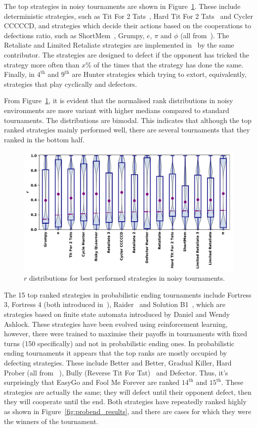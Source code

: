 \documentclass{article}
\begin{document}
The top strategies in noisy tournaments are shown in Figure~\ref{fig:noisy_results}. These include deterministic strategies, such
as Tit For 2 Tats~\cite{Axelrod1980b}, Hard Tit For 2 Tats~\cite{Stewart2012}
and Cycler CCCCCD, and strategies which decide their actions based on the
cooperations to defections ratio, such as ShortMem~\cite{Carvalho2013}, Grumpy,
$e$, $\pi$ and $\phi$ (all from~\cite{axelrodproject}). The Retaliate and
Limited Retaliate strategies are implemented in~\cite{axelrodproject} by the
same contributor. The strategies are designed to defect if the opponent has
tricked the strategy more often than \(x\%\) of the times that the strategy has
done the same. Finally, in $4^{\text{th}}$ and $9^{\text{th}}$ are Hunter
strategies which trying to extort, equivalently, strategies that play cyclically
and defectors.

From Figure~\ref{fig:noisy_results}, it is evident that the normalised rank
distributions in noisy environments are more variant with higher medians
compared to standard tournaments. The distributions are bimodal.
This indicates that although the top ranked strategies mainly performed
well, there are several tournaments that they ranked in the bottom half.

\begin{figure}[!htbp]
    \centering
    \includegraphics[width=.55\textwidth]{../images/performance_noise.pdf}
    \caption{\(r\) distributions for best performed strategies in noisy tournaments.}
    \label{fig:noisy_results}
\end{figure}

The 15 top ranked strategies in probabilistic ending tournaments include
Fortress 3, Fortress 4 (both introduced in~\cite{Ashlock2006}),
Raider~\cite{Ashlock2014} and Solution B1~\cite{Ashlock2014}, which are
strategies based on finite state automata introduced by Daniel and Wendy
Ashlock. These strategies have been evolved using reinforcement learning, however,
there were trained to maximise their payoffs in tournaments with fixed turns
(150 specifically) and not in probabilistic ending ones. In probabilistic ending
tournaments it appears that the top ranks are mostly occupied by defecting
strategies. These include Better and Better, Gradual Killer, Hard Prober (all
from ~\cite{prison}), Bully (Reverse Tit For Tat)~\cite{Nachbar1992} and
Defector. Thus, it's surprisingly that EasyGo and Fool Me Forever are ranked
$14^{\text{th}}$ and $15^{\text{th}}$. These strategies are actually the same;
they will defect until their opponent defect, then they will cooperate until the
end. Both strategies have repeatedly ranked highly as shown in
Figure~\ref{fig:probend_results}, and there are cases for which they were the
winners of the tournament.
\end{document}
